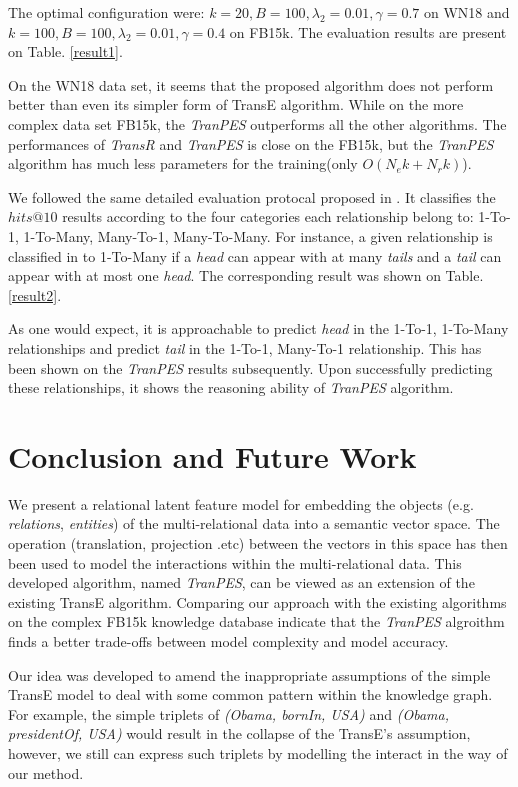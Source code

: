 \documentclass[9pt]{sig-alternate-05-2015}
\begin{document}
The optimal configuration were: $k=20, B = 100, \lambda_2=0.01, \gamma=0.7$ on WN18 and $k=100, B=100, \lambda_2 = 0.01, \gamma=0.4$ on FB15k. The evaluation results are present on Table. \ref{result1}.

On the WN18 data set, it seems that the proposed algorithm does not perform better than even its simpler form of TransE algorithm. While on the more complex data set FB15k, the \emph{TranPES} outperforms all the other algorithms.  The performances of \emph{TransR} and \emph{TranPES} is close on the FB15k, but the \emph{TranPES} algorithm has much less parameters for the training(only $O(N_ek+N_rk)$).

We followed the same detailed evaluation protocal proposed in \cite{bordes_translating_2013}. It classifies the $hits@10$ results according to the four categories each relationship belong to:  1-To-1, 1-To-Many, Many-To-1, Many-To-Many. For instance, a given relationship is classified in to 1-To-Many if a \emph{head} can appear with at many \emph{tails} and a \emph{tail} can appear with at most one \emph{head}.  The corresponding result was shown on Table. \ref{result2}. 

As one would expect, it is approachable to predict \emph{head} in the 1-To-1, 1-To-Many  relationships and predict \emph{tail} in the 1-To-1, Many-To-1 relationship. This has been shown on the \emph{TranPES} results subsequently. Upon successfully predicting these relationships, it shows the reasoning ability of \emph{TranPES} algorithm.




\section{Conclusion and Future Work} \label{conclusion}
We present a relational latent feature model for embedding the objects (e.g. \emph{relations}, \emph{entities}) of the multi-relational data into a semantic vector space.  The operation (translation, projection .etc) between the vectors in this space has then been used to model the interactions within the multi-relational data. This developed algorithm, named \emph{TranPES}, can be viewed as an extension of the existing TransE algorithm. Comparing our approach with the existing algorithms on the complex FB15k knowledge database indicate that the \emph{TranPES} algroithm finds a better trade-offs between model complexity and model accuracy.

Our idea was developed to amend the inappropriate assumptions of the simple TransE model to deal with some common pattern within the knowledge graph. For example, the simple triplets of \emph{(Obama, bornIn, USA)} and \emph{(Obama, presidentOf, USA)} would result in the collapse of the TransE's assumption, however, we still can express such triplets by modelling the interact in the way of our method.
\end{document}

